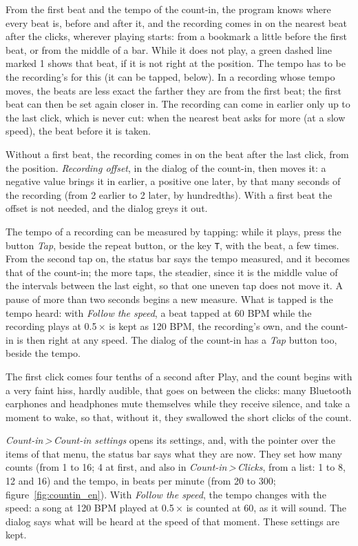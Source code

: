 \documentclass[12pt,
              article,
              oneside
              ]{memoir}
\newcommand*{\menu}[1]{\textit{#1}}
\newcommand*{\then}{\,>\,}
\newcommand*{\key}[1]{\texttt{#1}}
\begin{document}
From the first beat and the tempo of the count-in, the program knows where
every beat is, before and after it, and the recording comes in on the
nearest beat after the clicks, wherever playing starts: from a bookmark a
little before the first beat, or from the middle of a bar. While it does
not play, a green dashed line marked 1 shows that beat, if it is not right
at the position. The tempo has to be the recording's for this (it can be
tapped, below). In a recording whose tempo moves, the beats are less exact
the farther they are from the first beat; the first beat can then be set
again closer in. The recording can come in earlier only up to the last
click, which is never cut: when the nearest beat asks for more (at a slow
speed), the beat before it is taken.

%
Without a first beat, the recording comes in on the beat after the last
click, from the position. \menu{Recording offset}, in the dialog of the
count-in, then moves it: a negative value brings it in earlier, a positive
one later, by that many seconds of the recording (from 2 earlier to 2
later, by hundredths). With a first beat the offset is not needed, and the
dialog greys it out.

%
The tempo of a recording can be measured by tapping: while it plays,
press the button \menu{Tap}, beside the repeat button, or the key \key{T}, with the
beat, a few times. From the second tap on, the status bar says the tempo
measured, and it becomes that of the count-in; the more taps, the steadier,
since it is the middle value of the intervals between the last eight, so
that one uneven tap does not move it. A pause of more than two seconds
begins a new measure. What is tapped is the tempo heard: with
\menu{Follow the speed}, a beat tapped at 60 BPM while the recording
plays at 0.5\,× is kept as 120 BPM, the recording's own, and the
count-in is then right at any speed. The dialog of the count-in has a
\menu{Tap} button too, beside the tempo.

%
The first click comes four tenths of a second after Play, and the count
begins with a very faint hiss, hardly audible, that goes on between the
clicks: many Bluetooth earphones and headphones mute themselves while they
receive silence, and take a moment to wake, so that, without it, they
swallowed the short clicks of the count.

\menu{Count-in\then Count-in settings} opens its settings, and, with the
pointer over the items of that menu, the status bar says what they are now. They set how many counts (from 1 to 16; 4 at first, and also in
\menu{Count-in\then Clicks}, from a list: 1 to 8, 12 and 16) and the tempo, in beats per minute
(from 20 to 300; figure~\ref{fig:countin_en}). With \menu{Follow the
speed}, the tempo changes with the speed: a song at 120 BPM played at
0.5\,× is counted at 60, as it will sound. The dialog says what will be
heard at the speed of that moment. These settings are kept.
\end{document}
